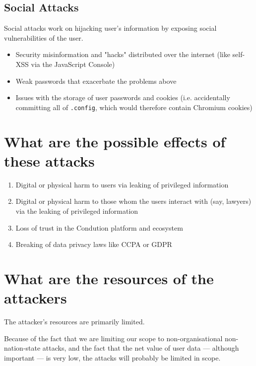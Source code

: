 \documentclass[letterpaper]{article}
\begin{document}
\subsection{Social Attacks}
\label{sec:orgb7976e9}
Social attacks work on hijacking user's information by exposing social vulnerabilities of the user.

\begin{itemize}
\item Security misinformation and "hacks" distributed over the internet (like self-XSS via the JavaScript Console)
\item Weak passwords that exacerbate the problems above
\item Issues with the storage of user passwords and cookies (i.e. accidentally committing all of \texttt{.config}, which would therefore contain Chromium cookies)
\end{itemize}

\section{What are the possible effects of these attacks}
\label{sec:org6e7cd62}
\begin{enumerate}
\item Digital or physical harm to users via leaking of privileged information
\item Digital or physical harm to those whom the users interact with (say, lawyers) via the leaking of privileged information
\item Loss of trust in the Condution platform and ecosystem
\item Breaking of data privacy laws like CCPA or GDPR
\end{enumerate}

\section{What are the resources of the attackers}
\label{sec:org1a2bdca}
The attacker's resources are primarily limited.

Because of the fact that we are limiting our scope to non-organisational non-nation-state attacks, and the fact that the net value of user data --- although important --- is very low, the attacks will probably be limited in scope.
\end{document}
